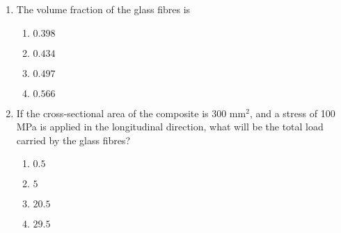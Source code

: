 \documentclass[journal]{IEEEtran}
\begin{document}
\begin{enumerate}
\section{\textbf{Linked Answer Questions}}
\textbf{Statement for Linked Answers Questions \ref{Linked_questions1} and \ref{Linked_questions2}:} \\ A continuous and aligned glass fibre reinforced composite has a modulus of elasticity of 150 GPa in the longitudinal direction. The matrix is a polyester resin with a modulus of 4.5 GPa. The glass fibre has a modulus of 340 GPa.\\
\item\label{Linked_questions1} The volume fraction of the glass fibres is
\begin{multicols}{4}
\begin{enumerate}
    \item $0.398$
    \item $0.434$
    \item $0.497$
    \item $0.566$
\end{enumerate}
\end{multicols}
\item\label{Linked_questions2} If the cross-sectional area of the composite is 300
 mm$^{2}$, and a stress of 100 MPa is applied in the longitudinal direction, what will be the total load  carried by the glass fibres?  
\begin{multicols}{2}
\begin{enumerate}
    \item $0.5$
    \item $5$
    \item $20.5$
    \item $29.5$
\end{enumerate}
\end{multicols}
\end{enumerate}
\end{document}
